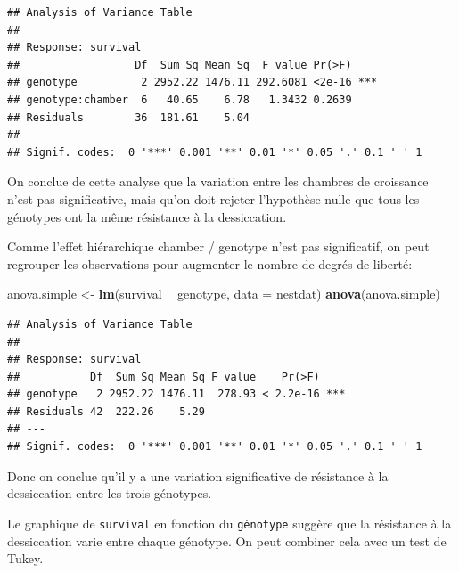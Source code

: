 \documentclass[12pt,]{book}
\newenvironment{Shaded}{\begin{snugshade}}{\end{snugshade}}
\newcommand{\DataTypeTok}[1]{\textcolor[rgb]{0.27,0.27,0.27}{#1}}
\newcommand{\KeywordTok}[1]{\textcolor[rgb]{0.27,0.27,0.27}{\textbf{#1}}}
\newcommand{\NormalTok}[1]{#1}
\newcommand{\OperatorTok}[1]{\textcolor[rgb]{0.43,0.43,0.43}{\textbf{#1}}}
\newcommand{\StringTok}[1]{\textcolor[rgb]{0.5,0.5,0.5}{#1}}
\begin{document}
\fi

\begin{verbatim}
## Analysis of Variance Table
## 
## Response: survival
##                  Df  Sum Sq Mean Sq  F value Pr(>F)    
## genotype          2 2952.22 1476.11 292.6081 <2e-16 ***
## genotype:chamber  6   40.65    6.78   1.3432 0.2639    
## Residuals        36  181.61    5.04                    
## ---
## Signif. codes:  0 '***' 0.001 '**' 0.01 '*' 0.05 '.' 0.1 ' ' 1
\end{verbatim}

On conclue de cette analyse que la variation entre les chambres de croissance n'est pas significative, mais qu'on doit rejeter l'hypothèse nulle que tous les génotypes ont la même résistance à la dessiccation.

Comme l'effet hiérarchique chamber / genotype n'est pas significatif, on peut regrouper les observations pour augmenter le nombre de degrés de liberté:

\begin{Shaded}
\begin{Highlighting}[]
\NormalTok{anova.simple <-}\StringTok{ }\KeywordTok{lm}\NormalTok{(survival }\OperatorTok{~}\StringTok{ }\NormalTok{genotype, }\DataTypeTok{data =}\NormalTok{ nestdat)}
\KeywordTok{anova}\NormalTok{(anova.simple)}
\end{Highlighting}
\end{Shaded}

\begin{verbatim}
## Analysis of Variance Table
## 
## Response: survival
##           Df  Sum Sq Mean Sq F value    Pr(>F)    
## genotype   2 2952.22 1476.11  278.93 < 2.2e-16 ***
## Residuals 42  222.26    5.29                      
## ---
## Signif. codes:  0 '***' 0.001 '**' 0.01 '*' 0.05 '.' 0.1 ' ' 1
\end{verbatim}

Donc on conclue qu'il y a une variation significative de résistance à la dessiccation entre les trois génotypes.

Le graphique de \texttt{survival} en fonction du \texttt{génotype} suggère que la résistance à la dessiccation varie entre chaque génotype. On peut combiner cela avec un test de Tukey.
\end{document}
